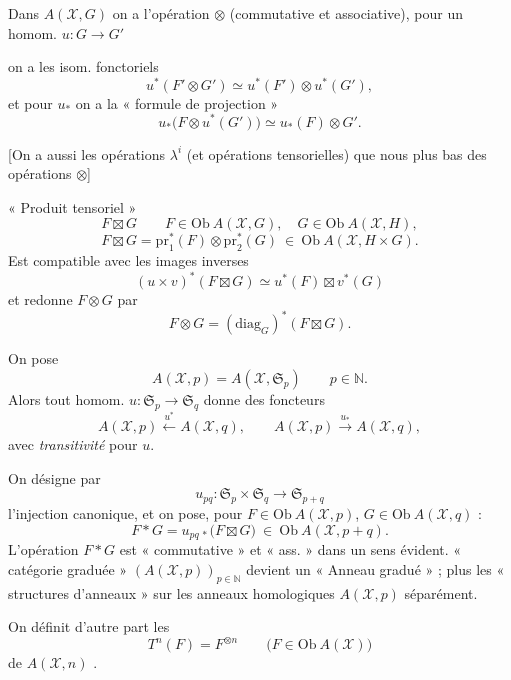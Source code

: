 \documentclass[11pt,a4paper]{article}
\begin{document}
Dans $A(\mathcal{X}, G)$ on a l'opération $\otimes$ (commutative et
associative), pour un homom. $u : G \to G'$

on a les isom. fonctoriels
\[
  u^{*}(F' \otimes G') \simeq u^{*}(F') \otimes u^{*}(G'),
\]
et pour $u_{*}$ on a la « formule de projection »
\[
  u_{*}\bigl(F \otimes u^{*}(G')\bigr) \simeq u_{*}(F) \otimes G' .
\]

[On a aussi les opérations $\lambda^{i}$ (et 
opérations tensorielles) que nous  plus bas des
opérations $\otimes$]

« Produit tensoriel  »
\[
  F \boxtimes G \qquad
  F \in \mathrm{Ob}\ A(\mathcal{X}, G), \quad G \in \mathrm{Ob}\ A(\mathcal{X}, H),
\]
\[
  F \boxtimes G = \mathrm{pr}_{1}^{*}(F) \otimes \mathrm{pr}_{2}^{*}(G)
  \ \in\ \mathrm{Ob}\ A(\mathcal{X}, H \times G) .
\]
Est compatible avec les images inverses
\[
  (u \times v)^{*}(F \boxtimes G) \simeq u^{*}(F) \boxtimes v^{*}(G)
\]
et redonne $F \otimes G$ par
\[
  F \otimes G = (\mathrm{diag}_{G})^{*}(F \boxtimes G) .
\]

On pose
\[
  A(\mathcal{X}, p) = A(\mathcal{X}, \mathfrak{S}_{p}) \qquad p \in \mathbb{N} .
\]
Alors tout homom. $u : \mathfrak{S}_{p} \to \mathfrak{S}_{q}$ donne
des foncteurs
\[
  A(\mathcal{X}, p) \xleftarrow{\ u^{*}\ } A(\mathcal{X}, q),
  \qquad
  A(\mathcal{X}, p) \xrightarrow{\ u_{*}\ } A(\mathcal{X}, q) ,
\]
avec \emph{transitivité} pour $u$.

On désigne par
\[
  u_{pq} : \mathfrak{S}_{p} \times \mathfrak{S}_{q} \longrightarrow \mathfrak{S}_{p+q}
\]
l'injection canonique, et on pose, pour
$F \in \mathrm{Ob}\ A(\mathcal{X}, p)$, $G \in \mathrm{Ob}\ A(\mathcal{X}, q)$ :
\[
  F * G = u_{pq\,*}\bigl(F \boxtimes G\bigr) \ \in\ \mathrm{Ob}\ A(\mathcal{X}, p+q) .
\]
L'opération $F * G$ est « commutative » et « ass. » dans un sens évident.
  
« catégorie graduée » $(A(\mathcal{X}, p))_{p \in \mathbb{N}}$ devient un
« Anneau gradué » ; \ill{} plus  les « structures
d'anneaux » sur les anneaux homologiques $A(\mathcal{X}, p)$ séparément.

 On définit d'autre part les
\[
  T^{n}(F) = F^{\otimes n} \qquad \bigl(F \in \mathrm{Ob}\ A(\mathcal{X})\bigr)
\]
 \ill{}  de $A(\mathcal{X}, n)$
.
\end{document}
